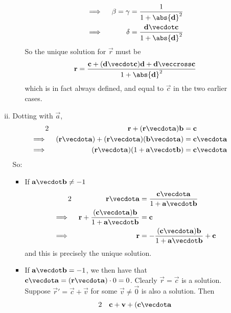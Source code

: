 \documentclass[fleqn,a4paper,11pt]{article}
\begin{document}
\begin{enumerate}
\begin{enumerate}[(i)]
\begin{itemize}
\begin{alignat*}
         \implies{}&&
            \beta = \gamma &= \frac 1{1 + \abs{\vec d}^2} \\
         \implies{}&&
            \delta &= \frac{\vec d \vecdot \vec c}{1 + \abs{\vec d}^2}
        \end{alignat*}
        So the unique solution for \(\vec r\) must be
        \begin{equation*}
         \vec r = \frac{\vec c + (\vec d \vecdot \vec c)\vec d
                        + \vec d \veccross \vec c}{1 + \abs{\vec d}^2}
        \end{equation*}
        which is in fact always defined, and equal to \(\vec c\) in the two
        earlier cases.
      \end{itemize}
     \item Dotting with \(\vec a\),
      \begin{alignat*}2
       && \vec r + (\vec r \vecdot \vec a)\vec b &= \vec c \\
       \implies{}&&
        (\vec r \vecdot \vec a)
        + (\vec r \vecdot \vec a)(\vec b \vecdot \vec a)
        &= \vec c \vecdot \vec a \\
       \implies{}&&
        (\vec r \vecdot \vec a)(1 + \vec a \vecdot \vec b)
        &= \vec c \vecdot \vec a
      \end{alignat*}
      So:
      \begin{itemize}
       \item If \(\vec a \vecdot \vec b \ne -1\)
        \begin{alignat*}2
         && \vec r \vecdot \vec a
          &= \frac{\vec c \vecdot \vec a}{1 + \vec a \vecdot \vec b} \\
         \implies{}&&
          \vec r + \frac{(\vec c \vecdot \vec a)\vec b}
                        {1 + \vec a \vecdot \vec b} &= \vec c \\
         \implies{}&&
          \vec r &= - \frac{(\vec c \vecdot \vec a)\vec b}
                            {1 + \vec a \vecdot \vec b} + \vec c
         \end{alignat*}
         and this is precisely the unique solution.
        \item
         If \(\vec a \vecdot \vec b = -1\), we then have that
         \(\vec c \vecdot \vec a = (\vec r \vecdot \vec a)\cdot 0 = 0\).
         Clearly \(\vec r = \vec c\) is a
         solution. Suppose \(\vec r' = \vec c + \vec v\) for some
         \(\vec v \ne \vec 0\) is also a solution. Then
         \begin{alignat*}2
          && \vec c + \vec v + (\vec c \vecdot \vec a

\end{alignat*}
\end{itemize}
\end{enumerate}
\end{enumerate}
\end{document}
